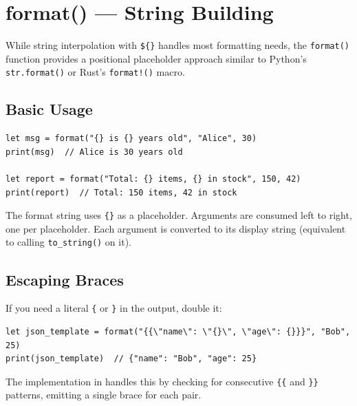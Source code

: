 
\section{format() --- String Building}\label{sec:format}


While string interpolation with \lstinline|${}| handles most formatting needs, the \lstinline|format()| function provides a positional placeholder approach similar to Python's \lstinline|str.format()| or Rust's \lstinline|format!()| macro.

\subsection{Basic Usage}

\begin{lstlisting}[language=Lattice, caption={Using format() for string building}]
let msg = format("{} is {} years old", "Alice", 30)
print(msg)  // Alice is 30 years old

let report = format("Total: {} items, {} in stock", 150, 42)
print(report)  // Total: 150 items, 42 in stock
\end{lstlisting}

The format string uses \lstinline|{}| as a placeholder.
Arguments are consumed left to right, one per placeholder.
Each argument is converted to its display string (equivalent to calling \lstinline|to_string()| on it).

\subsection{Escaping Braces}

If you need a literal \lstinline|{| or \lstinline|}| in the output, double it:

\begin{lstlisting}[language=Lattice, caption={Escaping braces in format strings}]
let json_template = format("{{\"name\": \"{}\", \"age\": {}}}", "Bob", 25)
print(json_template)  // {"name": "Bob", "age": 25}
\end{lstlisting}

The implementation in  handles this by checking for consecutive \lstinline|{{| and \lstinline|}}| patterns, emitting a single brace for each pair.

